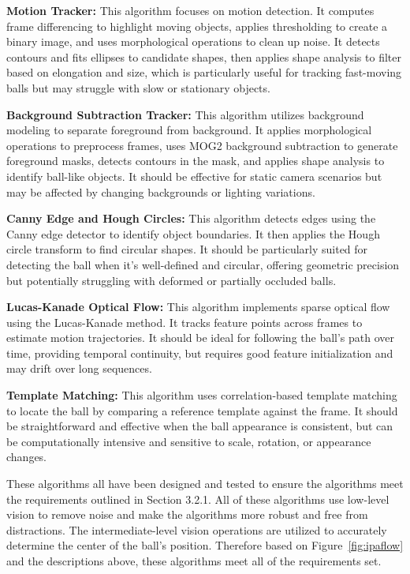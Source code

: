 \documentclass[12pt,a4paper]{article}
\begin{document}
    \textbf{Motion Tracker:} This algorithm focuses on motion detection. It computes frame differencing to highlight moving objects, applies thresholding to create a binary image, and uses morphological operations to clean up noise. It detects contours and fits ellipses to candidate shapes, then applies shape analysis to filter based on elongation and size, which is particularly useful for tracking fast-moving balls but may struggle with slow or stationary objects.
    
    \textbf{Background Subtraction Tracker:} This algorithm utilizes background modeling to separate foreground from background. It applies morphological operations to preprocess frames, uses MOG2 background subtraction to generate foreground masks, detects contours in the mask, and applies shape analysis to identify ball-like objects. It should be effective for static camera scenarios but may be affected by changing backgrounds or lighting variations.
    
    \textbf{Canny Edge and Hough Circles:} This algorithm detects edges using the Canny edge detector to identify object boundaries. It then applies the Hough circle transform to find circular shapes. It should be particularly suited for detecting the ball when it's well-defined and circular, offering geometric precision but potentially struggling with deformed or partially occluded balls.
    
    \textbf{Lucas-Kanade Optical Flow:} This algorithm implements sparse optical flow using the Lucas-Kanade method. It tracks feature points across frames to estimate motion trajectories. It should be ideal for following the ball's path over time, providing temporal continuity, but requires good feature initialization and may drift over long sequences.
    
    \textbf{Template Matching:} This algorithm uses correlation-based template matching to locate the ball by comparing a reference template against the frame. It should be straightforward and effective when the ball appearance is consistent, but can be computationally intensive and sensitive to scale, rotation, or appearance changes.

These algorithms all have been designed and tested to ensure the algorithms meet the requirements outlined in Section 3.2.1. All of these algorithms use low-level vision to remove noise and make the algorithms more robust and free from distractions. The intermediate-level vision operations are utilized to accurately determine the center of the ball's position. Therefore based on Figure~\ref{fig:ipaflow} and the descriptions above, these algorithms meet all of the requirements set.
\end{document}
